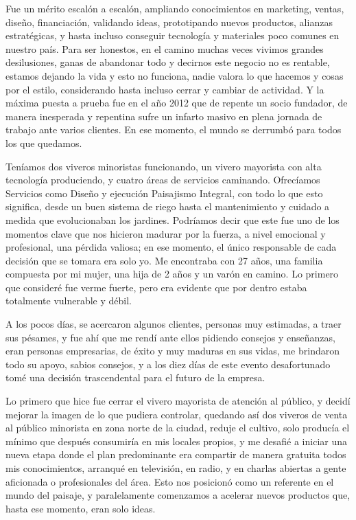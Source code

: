 \documentclass[
]{article}
\begin{document}
Fue un mérito escalón a escalón, ampliando conocimientos en marketing,
ventas, diseño, financiación, validando ideas, prototipando nuevos
productos, alianzas estratégicas, y hasta incluso conseguir tecnología y
materiales poco comunes en nuestro país. Para ser honestos, en el camino
muchas veces vivimos grandes desilusiones, ganas de abandonar todo y
decirnos este negocio no es rentable, estamos dejando la vida y esto no
funciona, nadie valora lo que hacemos y cosas por el estilo,
considerando hasta incluso cerrar y cambiar de actividad. Y la máxima
puesta a prueba fue en el año 2012 que de repente un socio fundador, de
manera inesperada y repentina sufre un infarto masivo en plena jornada
de trabajo ante varios clientes. En ese momento, el mundo se derrumbó
para todos los que quedamos.

Teníamos dos viveros minoristas funcionando, un vivero mayorista con
alta tecnología produciendo, y cuatro áreas de servicios caminando.
Ofrecíamos Servicios como Diseño y ejecución Paisajismo Integral, con
todo lo que esto significa, desde un buen sistema de riego hasta el
mantenimiento y cuidado a medida que evolucionaban los jardines.
Podríamos decir que este fue uno de los momentos clave que nos hicieron
madurar por la fuerza, a nivel emocional y profesional, una pérdida
valiosa; en ese momento, el único responsable de cada decisión que se
tomara era solo yo. Me encontraba con 27 años, una familia compuesta por
mi mujer, una hija de 2 años y un varón en camino. Lo primero que
consideré fue verme fuerte, pero era evidente que por dentro estaba
totalmente vulnerable y débil.

A los pocos días, se acercaron algunos clientes, personas muy estimadas,
a traer sus pésames, y fue ahí que me rendí ante ellos pidiendo consejos
y enseñanzas, eran personas empresarias, de éxito y muy maduras en sus
vidas, me brindaron todo su apoyo, sabios consejos, y a los diez días de
este evento desafortunado tomé una decisión trascendental para el futuro
de la empresa.

Lo primero que hice fue cerrar el vivero mayorista de atención al
público, y decidí mejorar la imagen de lo que pudiera controlar,
quedando así dos viveros de venta al público minorista en zona norte de
la ciudad, reduje el cultivo, solo producía el mínimo que después
consumiría en mis locales propios, y me desafié a iniciar una nueva
etapa donde el plan predominante era compartir de manera gratuita todos
mis conocimientos, arranqué en televisión, en radio, y en charlas
abiertas a gente aficionada o profesionales del área. Esto nos posicionó
como un referente en el mundo del paisaje, y paralelamente comenzamos a
acelerar nuevos productos que, hasta ese momento, eran solo ideas.
\end{document}
